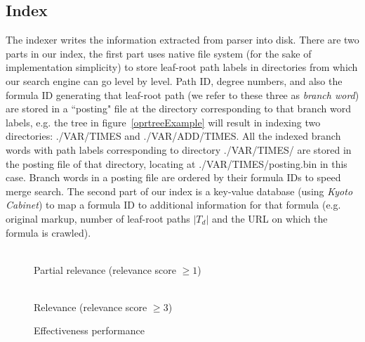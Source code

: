 \documentclass{acm_proc_article-sp}
\begin{document}
\subsection{Index}
The indexer writes the information extracted from parser into disk. 
There are two parts in our index, the first part uses native file system (for the sake of implementation simplicity) to store leaf-root path labels in directories from which our search engine can go level by level. 
Path ID, degree numbers, and also the formula ID generating that leaf-root path (we refer to these three as \textit{branch word}) are stored in a ``posting" file at the directory corresponding to that branch word labels, 
e.g. the tree in figure~\ref{oprtreeExample} will result in indexing two directories: ./VAR/TIMES and ./VAR/ADD/TIMES. 
All the indexed branch words with path labels corresponding to directory ./VAR/TIMES/ are stored in the posting file of that directory, locating at ./VAR/TIMES/posting.bin in this case.
Branch words in a posting file are ordered by their formula IDs to speed merge search.
The second part of our index is a key-value database (using \textit{Kyoto Cabinet}) to map a formula ID to additional information for that formula (e.g. original markup, number of leaf-root paths $|T_d|$ and the URL on which the formula is crawled).

\begin{figure*}
\begin{minipage}[b]{3.40in}
\begin{center}
\\Partial relevance (relevance score $\ge 1$) 
\end{center}
\end{minipage}
\hspace*{0in}
\begin{minipage}[b]{3.40in}
\begin{center}
\\Relevance (relevance score $\ge 3$)
\end{center}
\end{minipage}
\caption{Effectiveness performance}\label{perfcomp}
\end{figure*}
\end{document}
